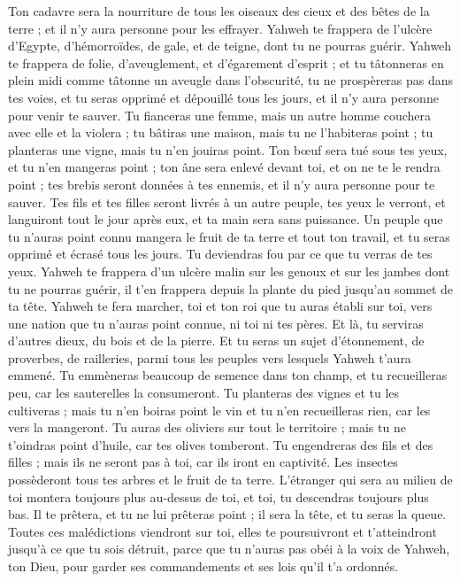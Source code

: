 \begin{multicols}{2}
Ton cadavre sera la nourriture de tous les oiseaux des cieux et des bêtes de la terre ; et il n'y aura personne pour les effrayer.
Yahweh te frappera de l'ulcère d'Egypte, d'hémorroïdes, de gale, et de teigne, dont tu ne pourras guérir.
Yahweh te frappera de folie, d'aveuglement, et d’égarement d’esprit ;
et tu tâtonneras en plein midi comme tâtonne un aveugle dans l’obscurité, tu ne prospèreras pas dans tes voies, et tu seras opprimé et dépouillé tous les jours, et il n’y aura personne pour venir te sauver.
Tu fianceras une femme, mais un autre homme couchera avec elle et la violera ; tu bâtiras une maison, mais tu ne l’habiteras point ; tu planteras une vigne, mais tu n'en jouiras point.
Ton bœuf sera tué sous tes yeux, et tu n'en mangeras point ; ton âne sera enlevé devant toi, et on ne te le rendra point ; tes brebis seront données à tes ennemis, et il n’y aura personne pour te sauver.
Tes fils et tes filles seront livrés à un autre peuple, tes yeux le verront, et languiront tout le jour après eux, et ta main sera sans puissance.
Un peuple que tu n'auras point connu mangera le fruit de ta terre et tout ton travail, et tu seras opprimé et écrasé tous les jours.
Tu deviendras fou par ce que tu verras de tes yeux.
Yahweh te frappera d'un ulcère malin sur les genoux et sur les jambes dont tu ne pourras guérir, il t'en frappera depuis la plante du pied jusqu'au sommet de ta tête.
Yahweh te fera marcher, toi et ton roi que tu auras établi sur toi, vers une nation que tu n'auras point connue, ni toi ni tes pères. Et là, tu serviras d'autres dieux, du bois et de la pierre.
Et tu seras un sujet d'étonnement, de proverbes, de railleries, parmi tous les peuples vers lesquels Yahweh t'aura emmené.
Tu emmèneras beaucoup de semence dans ton champ, et tu recueilleras peu, car les sauterelles la consumeront.
Tu planteras des vignes et tu les cultiveras ; mais tu n'en boiras point le vin et tu n'en recueilleras rien, car les vers la mangeront.
Tu auras des oliviers sur tout le territoire ; mais tu ne t'oindras point d'huile, car tes olives tomberont.
Tu engendreras des fils et des filles ; mais ils ne seront pas à toi, car ils iront en captivité.
Les insectes possèderont tous tes arbres et le fruit de ta terre.
L'étranger qui sera au milieu de toi montera toujours plus au-dessus de toi, et toi, tu descendras toujours plus bas.
Il te prêtera, et tu ne lui prêteras point ; il sera la tête, et tu seras la queue.
Toutes ces malédictions viendront sur toi, elles te poursuivront et t'atteindront jusqu'à ce que tu sois détruit, parce que tu n'auras pas obéi à la voix de Yahweh, ton Dieu, pour garder ses commandements et ses lois qu'il t'a ordonnés.

\end{multicols}
